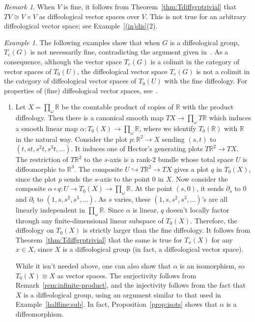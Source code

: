 \documentclass[12pt]{amsart}
\theoremstyle{remark}
\newtheorem{rem}[de]{Remark}
\newtheorem{ex}[de]{Example}
\newcommand{\ra}{\to}
\def \R{\mathbb{R}}
\begin{document}
%
%

\begin{rem}
When $V$ is fine, it follows from Theorem~\ref{thm:Tdiffgrptrivial} that
$TV \cong V \times V$ as
diffeological vector spaces over $V$.
This is not true for an arbitrary diffeological vector space;
see Example~\ref{(in)dis}(2).
\end{rem}

\begin{ex}\label{ex:notfine}
The following examples show that when $G$ is a diffeological group,
$T_e(G)$ is not necessarily fine, contradicting the argument given
in~\cite[Proposition~6.8]{HM}.
As a consequence, although the vector space $T_e(G)$ is a colimit in the category
of vector spaces of $T_0(U)$, the diffeological vector space $T_e(G)$ is not a colimit in the category
of diffeological vector spaces of $T_0(U)$ with the fine diffeology.
For properties of (fine) diffeological vector spaces, see~\cite{Wu}.

\begin{enumerate}
\item \label{item:inftyprod} Let $X = \prod_\omega \R$ be the countable product of copies of $\R$
with the product diffeology.
Then there is a canonical smooth map $TX \ra \prod_\omega T \R$
which induces a smooth linear map $\alpha:T_0(X) \ra \prod_\omega \R$,
where we identify $T_0 (\R)$ with $\R$ in the natural way.
Consider the plot $p: \R^2 \to X$ sending $(s,t)$ to $(t, st, s^2t, s^3t, \ldots)$.
It induces one of Hector's generating plots $T\R^2 \to TX$.
The restriction of $T \R^2$ to the $s$-axis is a rank-$2$ bundle
whose total space $U$ is diffeomorphic to $\R^3$.
The composite $U \hookrightarrow T\R^2 \to TX$ gives a plot $q$ in $T_0(X)$,
since the plot $p$ sends the $s$-axis to the point $0$ in $X$.
Now consider the composite $\alpha \circ q: U \ra T_0(X) \ra \prod_\omega \R$.
At the point $(s,0)$, it sends $\partial_s$ to $0$
and $\partial_t$ to $(1, s, s^2, s^3, \ldots)$.
As $s$ varies, these $(1, s, s^2, s^3, \ldots)$'s are all
linearly independent in $\prod_\omega \R$.
Since $\alpha$ is linear,
$q$ doesn't locally factor through any finite-dimensional linear subspace of $T_0(X)$.
Therefore, the diffeology on $T_0(X)$ is strictly larger than the fine diffeology.
It follows from Theorem~\ref{thm:Tdiffgrptrivial} that the same is true for $T_x(X)$ for any $x \in X$,
since $X$ is a diffeological group (in fact, a diffeological vector space).

While it isn't needed above, one can also show that $\alpha$ is an
isomorphism, so $T_0(X) \cong X$ as vector spaces.
The surjectivity follows from Remark~\ref{rem:infinite-product},
and the injectivity follows from the fact that $X$ is a diffeological group,
using an argument similar to that used in Example~\ref{halfline:sub}.
%
In fact, Proposition~\ref{prop:isots} shows that $\alpha$ is a diffeomorphism.


\end{enumerate}
\end{ex}
\end{document}
